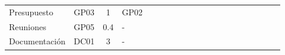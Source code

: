 \begin{longtable}[c]{llclllllllllllllllll}
        \multicolumn{1}{|l|}{Presupuesto}                                                                                       & \multicolumn{1}{l|}{GP03}                                                      & \multicolumn{1}{c|}{1}                                                           & \multicolumn{1}{l|}{GP02}                                                            &                                 &                                 &                                 &                                 &                                 &                                 &                                 &                                 &                                 &                                 & \cellcolor[HTML]{C6E0B4}        & \cellcolor[HTML]{C6E0B4}        & \cellcolor[HTML]{C6E0B4}        & \cellcolor[HTML]{C6E0B4}        & \multicolumn{1}{l|}{\cellcolor[HTML]{C6E0B4}} &  \\ \cline{1-4}
        \multicolumn{1}{|l|}{Reuniones}                                                                                         & \multicolumn{1}{l|}{GP05}                                                      & \multicolumn{1}{c|}{0.4}                                                         & \multicolumn{1}{l|}{-}                                                               &                                 &                                 &                                 & \cellcolor[HTML]{EF8787}        &                                 &                                 &                                 &                                 &                                 &                                 &                                 &                                 &                                 & \cellcolor[HTML]{EF8787}        & \multicolumn{1}{l|}{}                         &  \\ \cline{1-4}
        \multicolumn{1}{|l|}{Documentación}                                                                                     & \multicolumn{1}{l|}{DC01}                                                      & \multicolumn{1}{c|}{3}                                                           & \multicolumn{1}{l|}{-}                                                               & \cellcolor[HTML]{C9C9C9}        & \cellcolor[HTML]{C9C9C9}        & \cellcolor[HTML]{C9C9C9}        & \cellcolor[HTML]{C9C9C9}        & \cellcolor[HTML]{C9C9C9}        & \cellcolor[HTML]{C9C9C9}        & \cellcolor[HTML]{C9C9C9}        & \cellcolor[HTML]{C9C9C9}        & \cellcolor[HTML]{C9C9C9}        & \cellcolor[HTML]{C9C9C9}        & \cellcolor[HTML]{C9C9C9}        & \cellcolor[HTML]{C9C9C9}        & \cellcolor[HTML]{C9C9C9}        & \cellcolor[HTML]{C9C9C9}        & \multicolumn{1}{l|}{\cellcolor[HTML]{C9C9C9}} &  \\ \cline{1-19}

\end{longtable}
